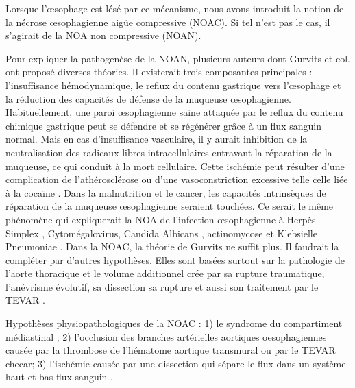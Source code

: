 \documentclass[./tfe.tex]{subfiles}
\begin{document}
Lorsque l’œsophage est lésé par ce mécanisme, nous avons introduit la notion de la nécrose œsophagienne aigüe compressive (NOAC). Si tel n’est pas le cas, il s’agirait de la NOA non compressive (NOAN).

Pour expliquer la pathogenèse de la NOAN, plusieurs auteurs dont Gurvits et col.\cite{gurvits_acute_2007} ont proposé diverses théories. Il existerait trois composantes principales : l’insuffisance hémodynamique, le reflux du contenu gastrique vers l’œsophage et la réduction des capacités de défense de la muqueuse œsophagienne. Habituellement, une paroi œsophagienne saine attaquée par le reflux du contenu chimique gastrique peut se défendre et se régénérer grâce à un flux sanguin normal. Mais en cas d’insuffisance vasculaire, il y aurait inhibition de la neutralisation des radicaux libres intracellulaires entravant la réparation de la muqueuse, ce qui conduit à la mort cellulaire. Cette ischémie peut résulter d’une complication de l’athérosclérose ou d’une vasoconstriction excessive telle celle liée à la cocaïne \cite{abdullah_clinical_2019}. Dans la malnutrition et le cancer, les capacités intrinsèques de réparation de la muqueuse œsophagienne seraient touchées. Ce serait le même phénomène qui expliquerait la NOA de l’infection œsophagienne à Herpès Simplex , Cytomégalovirus, Candida Albicans , actinomycose et Klebsielle Pneumoniae \cite{gurvits_acute_2007, abdullah_clinical_2019}.
Dans la NOAC, la théorie de Gurvits ne suffit plus. Il faudrait la compléter par d’autres hypothèses. Elles sont basées surtout sur la pathologie de l’aorte thoracique et le volume additionnel crée par sa rupture traumatique\cite{park_ischemic_2004}, l’anévrisme évolutif\cite{yaguchi_seven_2017, porcu_esophageal_2005}, sa dissection \cite{minatoya_transmural_2000, abou-al-shaar_free_2016, watanabe_esophageal_1999} sa rupture \cite{iuamoto_necrose_2015, tobisch_successful_2014, joubert_successful_2016, rascanu_osophagusnekrose_2009, koizumi_esophageal_2017} et aussi son traitement par le TEVAR \cite{iuamoto_necrose_2015, porcu_esophageal_2005, rascanu_osophagusnekrose_2009, abou-al-shaar_free_2016}.

Hypothèses physiopathologiques de la NOAC :
1) le syndrome du compartiment médiastinal \cite{tobisch_successful_2014, park_ischemic_2004, de_praetere_esophageal_2010, kaneda_delayed_2005, watanabe_esophageal_1999, lacombe_acute_1971, czerny_new_2014, papakonstantinou_oesophageal_2019} ;
2) l’occlusion des branches artérielles aortiques oesophagiennes causée par la thrombose de l'hématome aortique transmural \cite{minatoya_transmural_2000} ou par le TEVAR \cite{porcu_esophageal_2005, rascanu_osophagusnekrose_2009, lacombe_acute_1971} \cite{evangelista_insights_2018} checar;
3) l’ischémie causée par une dissection qui sépare le flux dans un système haut et bas flux sanguin \cite{joubert_successful_2016, porcu_esophageal_2005}.
\end{document}
